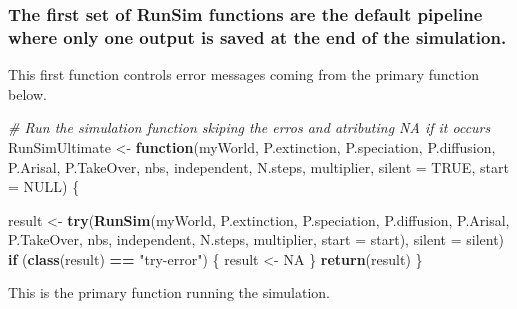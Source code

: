 \documentclass[]{book}
\newenvironment{Shaded}{\begin{snugshade}}{\end{snugshade}}
\newcommand{\KeywordTok}[1]{\textcolor[rgb]{0.13,0.29,0.53}{\textbf{{#1}}}}
\newcommand{\DataTypeTok}[1]{\textcolor[rgb]{0.13,0.29,0.53}{{#1}}}
\newcommand{\StringTok}[1]{\textcolor[rgb]{0.31,0.60,0.02}{{#1}}}
\newcommand{\CommentTok}[1]{\textcolor[rgb]{0.56,0.35,0.01}{\textit{{#1}}}}
\newcommand{\OtherTok}[1]{\textcolor[rgb]{0.56,0.35,0.01}{{#1}}}
\newcommand{\ControlFlowTok}[1]{\textcolor[rgb]{0.13,0.29,0.53}{\textbf{{#1}}}}
\newcommand{\OperatorTok}[1]{\textcolor[rgb]{0.81,0.36,0.00}{\textbf{{#1}}}}
\newcommand{\NormalTok}[1]{{#1}}
\theoremstyle{definition}
\theoremstyle{definition}
\theoremstyle{remark}
\begin{document}
\subsubsection{The first set of RunSim functions are the default
pipeline where only one output is saved at the end of the
simulation.}\label{the-first-set-of-runsim-functions-are-the-default-pipeline-where-only-one-output-is-saved-at-the-end-of-the-simulation.}

This first function controls error messages coming from the primary
function below.

\begin{Shaded}
\begin{Highlighting}[]
\CommentTok{# Run the simulation function skiping the erros and atributing NA if it occurs}
\NormalTok{RunSimUltimate <-}\StringTok{ }\ControlFlowTok{function}\NormalTok{(myWorld, P.extinction, P.speciation,}
\NormalTok{                           P.diffusion, P.Arisal, P.TakeOver, nbs, independent,}
\NormalTok{                           N.steps, multiplier,}
                           \DataTypeTok{silent =} \OtherTok{TRUE}\NormalTok{, }\DataTypeTok{start =} \OtherTok{NULL}\NormalTok{) \{}

\NormalTok{  result <-}\StringTok{ }\KeywordTok{try}\NormalTok{(}\KeywordTok{RunSim}\NormalTok{(myWorld, P.extinction, P.speciation,}
\NormalTok{                       P.diffusion, P.Arisal, P.TakeOver, nbs,}
\NormalTok{                       independent, N.steps,}
\NormalTok{                       multiplier, }\DataTypeTok{start =}\NormalTok{ start), }\DataTypeTok{silent =}\NormalTok{ silent)}
  \ControlFlowTok{if}\NormalTok{ (}\KeywordTok{class}\NormalTok{(result) }\OperatorTok{==}\StringTok{ "try-error"}\NormalTok{) \{}
\NormalTok{    result <-}\StringTok{ }\OtherTok{NA}
\NormalTok{  \}}
  \KeywordTok{return}\NormalTok{(result)}
\NormalTok{\}}
\end{Highlighting}
\end{Shaded}

This is the primary function running the simulation.
\end{document}
